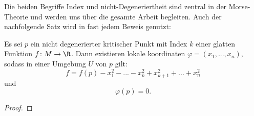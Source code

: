 \begin{remark}
    Die beiden Begriffe Index und nicht-Degeneriertheit sind zentral in der Morse-Theorie 
    und werden uns über die gesamte Arbeit begleiten. Auch der nachfolgende Satz wird in 
    fast jedem Beweis genutzt:
\end{remark}

\begin{theorem}
    \label{satz: morse-lemma}
    Es sei $p$ ein nicht degenerierter kritischer Punkt mit Index $k$ einer glatten 
    Funktion $f \colon M \to \R$. Dann existieren lokale koordinaten 
    $\varphi = (x_1, ..., x_n)$, sodass in einer Umgebung $U$ von $p$ gilt:
    \[ f = f(p) - x_1^2 - ... - x_k^2 + x_{k + 1}^2 + ... + x_n^2 \]
    und 
    \[ \varphi (p) = 0. \]
\end{theorem}

\begin{proof}
    
\end{proof}